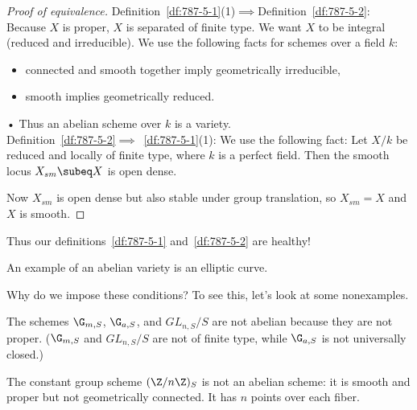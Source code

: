 \begin{proof}[Proof of equivalence]
Definition~\ref{df:787-5-1}(1)$\implies$Definition~\ref{df:787-5-2}: Because $X$ is proper, $X$ is separated of finite type. We want $X$ to be integral (reduced and irreducible). We use the following facts for schemes over a field $k$: 
\begin{itemize}
\item
connected and smooth together imply geometrically irreducible,
\item 
smooth implies geometrically reduced.
\end{itemize}•
 Thus an abelian scheme over $k$ is a variety.\\

\noindent
Definition~\ref{df:787-5-2}$\implies$~\ref{df:787-5-1}(1): We use the following fact: Let $X/k$ be reduced and locally of finite type, where $k$ is a perfect field. Then the smooth locus $X_{sm}\subeq X$ is open dense.

Now $X_{sm}$ is open dense but also stable under group translation, so $X_{sm}=X$ and $X$ is smooth.
\end{proof}
Thus our definitions~\ref{df:787-5-1} and~\ref{df:787-5-2} are healthy!

An example of an abelian variety is an elliptic curve.

Why do we impose these conditions? To see this, let's look at some nonexamples.
\begin{ex}
The schemes $\G_{m,S}$, $\G_{a,S}$, and $GL_{n,S}/S$ are not abelian because they are not proper.  ($\G_{m,S}$ and $GL_{n,S}/S$ are not of finite type, while $\G_{a,S}$ is not universally closed.)

The constant group scheme $(\Z/n\Z)_S$ is not an abelian scheme: it is smooth and proper but not geometrically connected. It has $n$ points over each %
fiber.
\end{ex}

